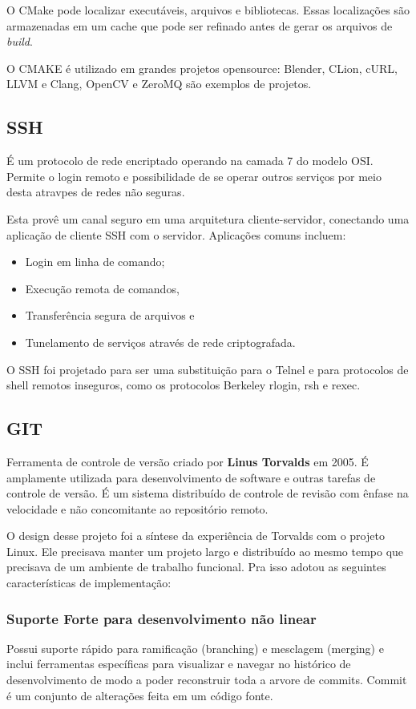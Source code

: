 \documentclass[
	article,			%
	12pt,				%
	oneside,			%
	a4paper,			%
	english,			%
	brazil,				%
	sumario=tradicional
	]{abntex2}
\begin{document}
O CMake pode localizar executáveis, arquivos e bibliotecas. Essas localizações são armazenadas em um cache que pode ser refinado antes de gerar os arquivos de \textit{build}.

O CMAKE é utilizado em grandes projetos opensource: Blender, CLion, cURL, LLVM e Clang, OpenCV e ZeroMQ são exemplos de projetos.


\subsection{SSH}
É um protocolo de rede encriptado operando na camada 7 do modelo OSI. Permite o login remoto e possibilidade de se operar outros serviços por meio desta atravpes de redes não seguras.

Esta provê um canal seguro em uma arquitetura cliente-servidor, conectando uma aplicação de cliente SSH com o servidor. Aplicações comuns incluem:

\begin{itemize}
	\item{Login em linha de comando;}
	\item{Execução remota de comandos,}
	\item{Transferência segura de arquivos e}
	\item{Tunelamento de serviços através de rede criptografada.}
\end{itemize}

O SSH foi projetado para ser uma substituição para o Telnel e para protocolos de shell remotos inseguros, como os protocolos Berkeley rlogin, rsh e rexec.

\subsection{GIT}

Ferramenta de controle de versão criado por \textbf{Linus Torvalds} em 2005. É amplamente utilizada para desenvolvimento de software e outras tarefas de controle de versão. É um sistema distribuído de controle de revisão com ênfase na velocidade e não concomitante ao repositório remoto. 

O design desse projeto foi a síntese da experiência de Torvalds com o projeto Linux. Ele precisava manter um projeto largo e distribuído ao mesmo tempo que precisava de um ambiente de trabalho funcional. Pra isso adotou as seguintes características de implementação:

\subsubsection{Suporte Forte para desenvolvimento não linear}
Possui suporte rápido para ramificação (branching) e mesclagem (merging) e inclui ferramentas específicas para visualizar e navegar no histórico de desenvolvimento de modo a poder reconstruir toda a arvore de commits. Commit é um conjunto de alterações feita em um código fonte.
\end{document}
